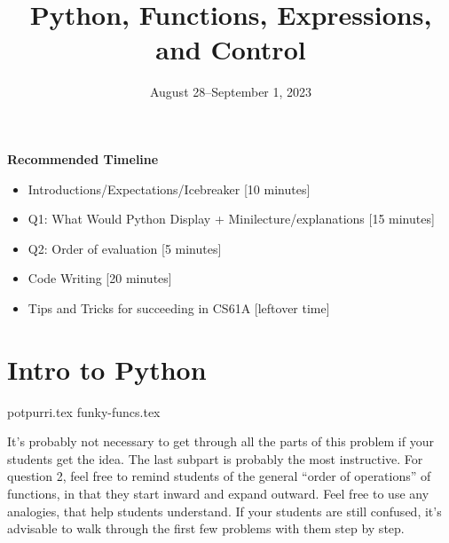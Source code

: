 \documentclass{exam}
\title{Python, Functions, Expressions, and Control}
\date{August 28--September 1, 2023}
\begin{document}
\maketitle
\begin{meta}
\textbf{Recommended Timeline}
\begin{itemize}
  \item Introductions/Expectations/Icebreaker [10 minutes]
  \item Q1: What Would Python Display + Minilecture/explanations [15 minutes]
  \item Q2: Order of evaluation [5 minutes]
  \item Code Writing [20 minutes]
  \item Tips and Tricks for succeeding in CS61A [leftover time]
\end{itemize}
\end{meta}


\section{Intro to Python}
\begin{questions}
{potpurri.tex}
{funky-funcs.tex}
\begin{questionmeta}
  It's probably not necessary to get through all the parts of this problem if your students get the idea. The last subpart is probably the most instructive. 
  For question 2, feel free to remind students of the general ``order of operations'' of functions, in that they start inward and expand outward. Feel free to use any analogies, that help students understand.
  If your students are still confused, it's advisable to walk through the first few problems with them step by step.
\end{questionmeta}
\end{questions}
\end{document}
